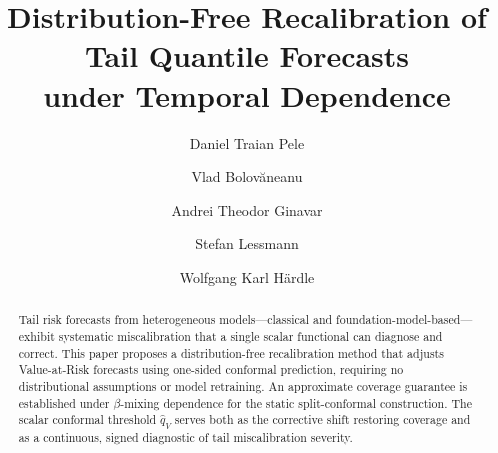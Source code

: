 \documentclass[preprint,11pt,authoryear]{elsarticle}
\newcommand{\1}{\boldsymbol{1}}
\begin{document}
	
	\begin{frontmatter}
		
		\title{Distribution-Free Recalibration of Tail Quantile Forecasts\\
			under Temporal Dependence}
		
		\author[1,2,3]{Daniel Traian Pele}
		
		\author[1]{Vlad Bolov\u{a}neanu}
		
		\author[1]{Andrei Theodor Ginavar}
		
		
		\author[1,4]{Stefan Lessmann}
		
		\author[1,3,4,5,6]{Wolfgang Karl H{\"a}rdle}
		
		
		
		
		
		
		\begin{abstract}
			Tail risk forecasts from heterogeneous models---classical and foundation-model-based---exhibit systematic miscalibration that a single scalar functional can diagnose and correct. This paper proposes a distribution-free recalibration method that adjusts Value-at-Risk forecasts using one-sided conformal prediction, requiring no distributional assumptions or model retraining. An approximate coverage guarantee is established under $\beta$-mixing dependence for the static split-conformal construction. The scalar conformal threshold $\hat{q}_V$ serves both as the corrective shift restoring coverage and as a continuous, signed diagnostic of tail miscalibration severity.


\end{abstract}
\end{frontmatter}
\end{document}
